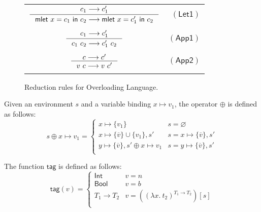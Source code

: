 \documentclass[preprint,authoryear,sort&compress,9pt,nocopyrightspace]{article}
\newcommand\rulename[1]{\mathsf{(#1)}}
\newcommand{\tto}{\longrightarrow}
\newcommand{\oletP}[3]{\mathsf{mlet} \ x = #2 \ \mathsf{in}  \ #3}
\newcommand{\absDT}{(\lambda x. \ t_2) ^{T_1 \to T_2}}
\newcommand{\lab}{\mathsf{tag}}
\newcommand{\boolt}{\mathsf{Bool}}
\newcommand{\intt}{\mathsf{Int}}
\newcommand{\semanticD}{Overloading Language}
\begin{document}
\begin{figure}
\begin{small}
\begin{center}
\begin{tabular}{|c r|}
$ \inference {c_1 \tto c_1'}{\oletP{T_1}{c_1}{c_2} \tto \oletP{T_1}{c_1'}{c_2} }$&$\rulename{Let1} $\\
&\\
$\inference {c_1 \tto c_1'}{c_1 \ c_2 \tto c_1' \ c_2} $&$\rulename{App1}  $\\
&\\
$ \inference {c \tto c'}{v \ c \tto v \ c'}$&$\rulename{App2}  $\\
&\\
\hline
\end{tabular}
\caption{Reduction rules for \semanticD.}
\label{tabla:sencilla}
\end{center}
\end{small}
\end{figure}

\begin{comment}
\begin{definition}[$\oplus$]
\label{definition:tcs}
\mbox{}
Given an environment  $s$ and a variable binding $x \mapsto (v_1:T_1)$, the operator $\oplus$ is defined  as follows:
\[ s \oplus x \mapsto (v_1:T_1) = \begin{cases} 
      x \mapsto \{(v_1:T_1)\}& s =  \varnothing \\
      x \mapsto \{(\overline{v : T})\} \cup \{(v_1 : T_1)\}, s' & s = x \mapsto \{(\overline{v : T})\}, s'\\
      y \mapsto \{(\overline{v : T})\}, s' \oplus x \mapsto (v_1:T_1) & s = y \mapsto \{(\overline{v : S})\}, s'\\
   \end{cases}
\]
\end{definition}
\end{comment}

\begin{definition}[$\oplus$]
\label{definition:tcs}
\mbox{}
Given an environment  $s$ and a variable binding $x \mapsto v_1$, the operator $\oplus$ is defined  as follows:
\[ s \oplus x \mapsto v_1 = \begin{cases} 
      x \mapsto \{v_1\}& s =  \varnothing \\
      x \mapsto \{\overline{v}\} \cup \{v_1\}, s' & s = x \mapsto \{\overline{v }\}, s'\\
      y \mapsto \{\overline{v}\}, s' \oplus x \mapsto v_1 & s = y \mapsto \{\overline{v}\}, s'\\
   \end{cases}
\]
\end{definition}


\begin{definition}[$\lab$]
\label{definition:tcs}
\mbox{}
The function $\lab$ is defined  as follows:
\[ \lab(v) = \begin{cases} 
      \intt & v = n \\
      \boolt & v = b \\
      T_1 \to T_2 & v  = (\absDT)[s]\\
   \end{cases}
\]
\end{definition}
\end{document}
